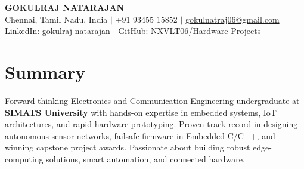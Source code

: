 \documentclass[a4paper,10pt]{article}
\begin{document}
\pagestyle{empty}

\begin{center}
    {\LARGE \textbf{\color{dark} GOKULRAJ NATARAJAN}} \\[4pt]
    \small
    {\color{secondary}
        \faMapMarker* Chennai, Tamil Nadu, India \hspace{6pt}$|$\hspace{6pt}
        \faPhone* +91 93455 15852 \hspace{6pt}$|$\hspace{6pt}
        \faEnvelope \hspace{2pt} \href{mailto:gokulnatraj06@gmail.com}{gokulnatraj06@gmail.com}
    } \\[3pt]
    \small
    \href{https://www.linkedin.com/in/gokulraj-natarajan-41a2ba36b}{\faLinkedin \hspace{2pt} LinkedIn: gokulraj-natarajan} \hspace{8pt}$|$\hspace{8pt}
    \href{https://github.com/NXVLT06/Hardware-Projects.git}{\faGithub \hspace{2pt} GitHub: NXVLT06/Hardware-Projects}
\end{center}

\vspace{-4pt}

\section{Summary}
\noindent
Forward-thinking Electronics and Communication Engineering undergraduate at \textbf{SIMATS University} with hands-on expertise in embedded systems, IoT architectures, and rapid hardware prototyping. Proven track record in designing autonomous sensor networks, failsafe firmware in Embedded C/C++, and winning capstone project awards. Passionate about building robust edge-computing solutions, smart automation, and connected hardware.

\end{document}
